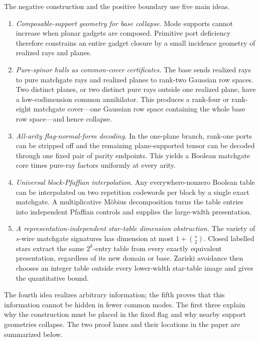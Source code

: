 \documentclass[11pt]{article}
\theoremstyle{definition}
\theoremstyle{remark}
\begin{document}
The negative construction and the positive boundary use five main ideas.
\begin{enumerate}
  \item \emph{Composable-support geometry for base collapse.}
  Mode supports cannot increase when planar gadgets are composed.  Primitive
  port deficiency therefore constrains an entire gadget closure by a small
  incidence geometry of realized rays and planes.

  \item \emph{Pure-spinor hulls as common-cover certificates.}
  The base sends realized rays to pure matchgate rays and realized planes to
  rank-two Gaussian row spaces.  Two distinct planes, or two distinct pure
  rays outside one realized plane, have a low-codimension common annihilator.
  This produces a rank-four or rank-eight matchgate cover---one Gaussian row
  space containing the whole base row space---and hence collapse.

  \item \emph{All-arity flag-normal-form decoding.}
  In the one-plane branch, rank-one ports can be stripped off and the
  remaining plane-supported tensor can be decoded through one fixed pair of
  parity endpoints.  This yields a Boolean matchgate core times pure-ray
  factors uniformly at every arity.

  \item \emph{Universal block-Pfaffian interpolation.}
  Any everywhere-nonzero Boolean table can be interpolated on two repetition
  codewords per block by a single exact matchgate.  A multiplicative
  M\"obius decomposition turns the table entries into independent Pfaffian
  controls and supplies the large-width presentation.

  \item \emph{A representation-independent star-table dimension
  obstruction.}
  The variety of $s$-wire matchgate signatures has dimension at most
  $1+\binom{s}{2}$.  Closed labelled stars extract the same $2^k$-entry
  table from every exactly equivalent presentation, regardless of its new
  domain or base.  Zariski avoidance then chooses an integer table outside
  every lower-width star-table image and gives the quantitative bound.
\end{enumerate}

The fourth idea realizes arbitrary information; the fifth proves that this
information cannot be hidden in fewer common modes.  The first three explain
why the construction must be placed in the fixed flag and why nearby support
geometries collapse.  The two proof lanes and their locations in the paper
are summarized below.
\end{document}
